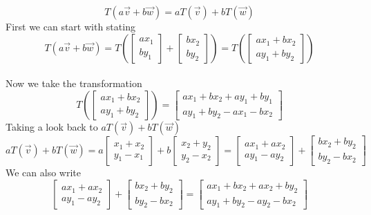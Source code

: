 \documentclass[12pt]{article}
\begin{document}
\begin{equation*}
T(a\vec{v}+b\vec{w}) = aT(\vec{v}) + bT(\vec{w})
\end{equation*}
First we can start with stating
\begin{equation*}T(a\vec{v}+b\vec{w}) = T\left(\begin{bmatrix}ax_1 \\ by_1\end{bmatrix} + \begin{bmatrix}bx_2 \\ by_2\end{bmatrix}\right)
= T\left(\begin{bmatrix}ax_1 + bx_2\\ ay_1+by_2\end{bmatrix}\right)\end{equation*}
\\ Now we take the transformation
\begin{equation*}
T\left(\begin{bmatrix}ax_1 + bx_2\\ ay_1+by_2\end{bmatrix}\right) = \begin{bmatrix}ax_1 + bx_2 + ay_1+by_1 \\ ay_1 + by_2 - ax_1-bx_2 \end{bmatrix}
\end{equation*}
Taking a look back to $aT(\vec{v}) + bT(\vec{w})$
\begin{equation*}
aT(\vec{v}) + bT(\vec{w}) = a\begin{bmatrix}x_1 + x_2 \\ y_1-x_1 \end{bmatrix} + b\begin{bmatrix}x_2 + y_2 \\ y_2-x_2 \end{bmatrix} = \begin{bmatrix}ax_1 + ax_2\\ ay_1-ay_2\end{bmatrix} + \begin{bmatrix}bx_2 + by_2\\ by_2-bx_2\end{bmatrix}
\end{equation*}
We can also write
\begin{equation*}
 \begin{bmatrix}ax_1 + ax_2\\ ay_1-ay_2\end{bmatrix} + \begin{bmatrix}bx_2 + by_2\\ by_2-bx_2\end{bmatrix} = \begin{bmatrix}ax_1 + bx_2+ax_2+by_2 \\ ay_1+by_2 - ay_2-bx_2\end{bmatrix}\end{equation*}
\end{document}
